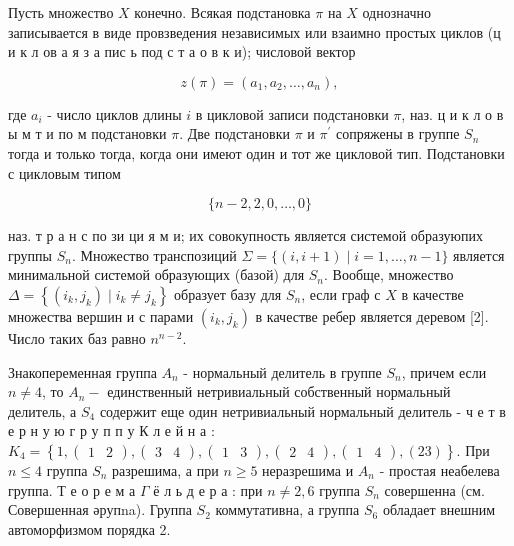 \documentclass[10pt]{article}
\begin{document}
Пусть множество $X$ конечно. Всякая подстановка $\pi$ на $X$ однозначно записывается в виде провзведения независимых или взаимно простых циклов (ц и к л ов а я з а пис ь под с т а о в к и); числовой вектор



\[

z(\pi)=\left(a_{1}, a_{2}, \ldots, a_{n}\right),

\]



где $a_{i}$ - число циклов длины $i$ в цикловой записи подстановки $\pi$, наз. ц и к л о в ы м т и по м подстановки $\pi$. Две подстановки $\pi$ и $\pi^{\prime}$ сопряжены в группе $S_{n}$ тогда и только тогда, когда они имеют один и тот же цикловой тип. Подстановки с цикловым типом



\[

\{n-2,2,0, \ldots, 0\}

\]



наз. т р а н с по зи ци я м и; их совокупность является системой образуюпих группы $S_{n}$. Множество транспозиций $\Sigma=\{(i, i+1) \mid i=1, \ldots, n-1\}$ является минимальной системой образующих (базой) для $S_{n}$. Вообще, множество $\Delta=\left\{\left(i_{k}, j_{k}\right) \mid i_{k} \neq j_{k}\right\}$ образует базу для $S_{n}$, если граф с $X$ в качестве множества вершин и с парами $\left(i_{k}, j_{k}\right)$ в качестве ребер является деревом [2]. Число таких баз равно $n^{n-2}$.



Знакопеременная группа $A_{n}$ - нормальный делитель в группе $S_{n}$, причем если $n \neq 4$, то $A_{n}-$ единственный нетривиальный собственный нормальный делитель, а $S_{4}$ содержит еще один нетривиальный нормальный делитель - ч е т в е р н у ю г р у п п у К л е й н а : $K_{4}=\left\{1,\left(\begin{array}{ll}1 & 2\end{array}\right),\left(\begin{array}{ll}3 & 4\end{array}\right),\left(\begin{array}{ll}1 & 3\end{array}\right),\left(\begin{array}{ll}2 & 4\end{array}\right),\left(\begin{array}{ll}1 & 4\end{array}\right),(23)\right\}$. При $n \leqslant 4$ группа $S_{n}$ разрешима, а при $n \geqslant 5$ неразрешима и $A_{n}$ - простая неабелева группа. Т е о р е м а $\Gamma$ ё л ь д е р а : при $n \neq 2,6$ группа $S_{n}$ совершенна (см. Совершенная әрупna). Группа $S_{2}$ коммутативна, а группа $S_{6}$ обладает внешним автоморфизмом порядка 2.
\end{document}
